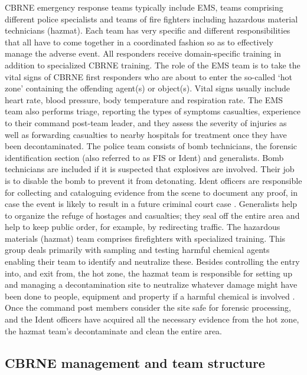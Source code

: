 \documentclass[link]{IWCOMP}
\begin{document}
CBRNE emergency response teams typically include EMS, teams comprising
different police specialists and teams of fire fighters including hazardous
material technicians (hazmat). Each team has very specific and different
responsibilities that all have to come together in a coordinated fashion so
as to effectively manage the adverse event. All responders receive
domain-specific training in addition to specialized CBRNE training. The role
of the EMS team is to take the vital signs of CBRNE first responders who are
about to enter the so-called `hot zone' containing the offending agent(s) or
object(s)\break \citep{bib24,bib12}. Vital signs usually include
heart rate, blood pressure, body temperature and respiration rate. The EMS
team also performs triage, reporting the types of symptoms casualties,
experience to their command post-team leader, and they assess the severity
of injuries as well as forwarding casualties to nearby hospitals for
treatment once they have been decontaminated. The police team consists of
bomb technicians, the forensic identification section (also referred to as
FIS or Ident) and generalists. Bomb technicians are included if it is
suspected that explosives are involved. Their job is to disable the bomb to
prevent it from detonating. Ident officers are responsible for collecting
and cataloguing evidence from the scene to document any proof, in case the
event is likely to result in a future criminal court case \citep{bib31}. Generalists help to organize the refuge of hostages and casualties;
they seal off the entire area and help to keep public order, for example, by
redirecting traffic. The hazardous materials (hazmat) team comprises
firefighters with specialized training. This group deals primarily with
sampling and testing harmful chemical agents enabling their team to identify
and neutralize these. Besides controlling the entry into, and exit from, the
hot zone, the hazmat team is responsible for setting up and managing a
decontamination site to neutralize whatever damage might have been done to
people, equipment and property if a harmful chemical is involved \citep{bib24}. Once the command post members consider the site safe for forensic
processing, and the Ident officers have acquired all the necessary evidence
from the hot zone, the hazmat team's decontaminate and clean the entire
area.

\subsection{CBRNE management and team structure}\label{subsec1.2}
\end{document}
